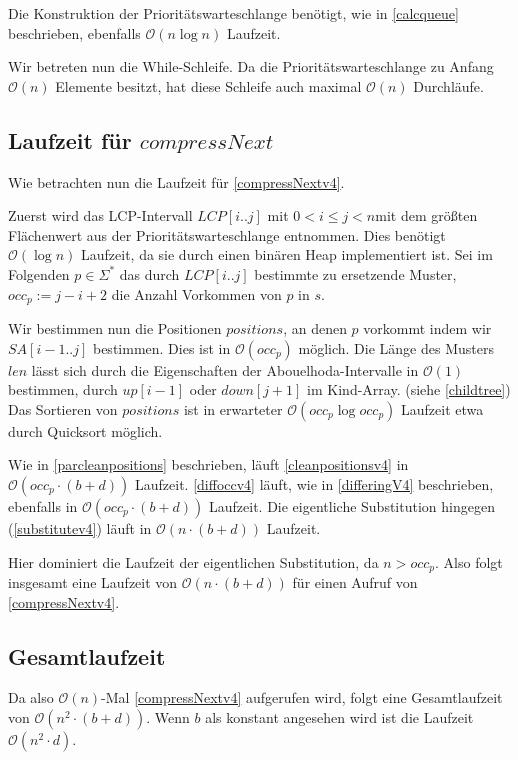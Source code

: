Die Konstruktion der Prioritätswarteschlange benötigt, wie in \autoref{calcqueue} beschrieben, ebenfalls $\mathcal{O}(n \log n)$ Laufzeit.

Wir betreten nun die While-Schleife. Da die Prioritätswarteschlange zu Anfang $\mathcal{O}(n)$ Elemente besitzt, hat diese Schleife auch maximal $\mathcal{O}(n)$ Durchläufe.

\subsection{Laufzeit für $compressNext$}

Wie betrachten nun die Laufzeit für \autoref{compressNextv4}.

Zuerst wird das LCP-Intervall $LCP[i..j]$ mit $0 < i \leq j < n$mit dem größten Flächenwert aus der Prioritätswarteschlange entnommen. Dies benötigt $\mathcal{O}(\log n)$ Laufzeit, da sie durch einen binären Heap implementiert ist.
Sei im Folgenden $p \in \Sigma^*$ das durch $LCP[i..j]$ bestimmte zu ersetzende Muster, $occ_p := j - i + 2$ die Anzahl Vorkommen von $p$ in $s$.  

Wir bestimmen nun die Positionen $positions$, an denen $p$ vorkommt indem wir $SA[i-1..j]$ bestimmen. Dies ist in $\mathcal{O}(occ_p)$ möglich.
Die Länge des Musters $len$ lässt sich durch die Eigenschaften der Abouelhoda-Intervalle in $\mathcal{O}(1)$ bestimmen, durch $up[i-1]$ oder $down[j+1]$ im Kind-Array. (siehe \autoref{childtree})
Das Sortieren von $positions$ ist in erwarteter $\mathcal{O}(occ_p \log occ_p)$ Laufzeit etwa durch Quicksort möglich.

Wie in \autoref{parcleanpositions} beschrieben, läuft \autoref{cleanpositionsv4} in $\mathcal{O}(occ_p \cdot (b + d))$ Laufzeit.
\autoref{diffoccv4} läuft, wie in \autoref{differingV4} beschrieben, ebenfalls in $\mathcal{O}(occ_p \cdot (b + d))$ Laufzeit.
Die eigentliche Substitution hingegen (\autoref{substitutev4}) läuft in $\mathcal{O}(n \cdot (b + d))$ Laufzeit.

Hier dominiert die Laufzeit der eigentlichen Substitution, da $n > occ_p$.
Also folgt insgesamt eine Laufzeit von $\mathcal{O}(n \cdot (b + d))$ für einen Aufruf von \autoref{compressNextv4}.

\subsection{Gesamtlaufzeit}

Da also $\mathcal{O}(n)$-Mal \autoref{compressNextv4} aufgerufen wird, folgt eine Gesamtlaufzeit von $\mathcal{O}(n^2 \cdot (b + d))$. Wenn $b$ als konstant angesehen wird ist die Laufzeit $\mathcal{O}(n^2 \cdot d)$.


